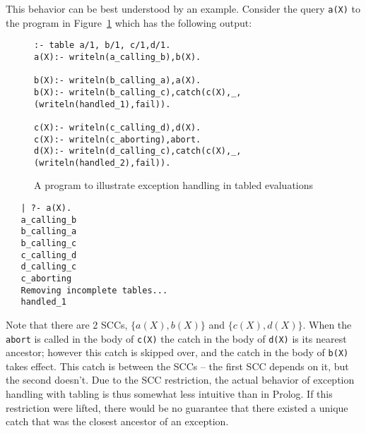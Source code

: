 This behavior can be best understood by an example.  Consider the
query {\tt a(X)} to the program in Figure~\ref{fig:tab_except} which
has the following output:
%
\begin{figure}[bhtp]
\longline
\begin{small}
\begin{verbatim}
:- table a/1, b/1, c/1,d/1.
a(X):- writeln(a_calling_b),b(X).

b(X):- writeln(b_calling_a),a(X).
b(X):- writeln(b_calling_c),catch(c(X),_,(writeln(handled_1),fail)).

c(X):- writeln(c_calling_d),d(X).
c(X):- writeln(c_aborting),abort.
d(X):- writeln(d_calling_c),catch(c(X),_,(writeln(handled_2),fail)).
\end{verbatim}
\end{small}
\caption{A program to illustrate exception handling in tabled evaluations} \label{fig:tab_except}
\longline
\end{figure}

\begin{small}
\begin{verbatim}
   | ?- a(X).
   a_calling_b
   b_calling_a
   b_calling_c
   c_calling_d
   d_calling_c
   c_aborting
   Removing incomplete tables...
   handled_1
\end{verbatim}
\end{small}
%
Note that there are 2 SCCs, $\{a(X),b(X)\}$ and $\{c(X),d(X)\}$.  When
the {\tt abort} is called in the body of {\tt c(X)} the catch in the
body of {\tt d(X)} is its nearest ancestor; however this catch is
skipped over, and the catch in the body of {\tt b(X)} takes effect.
This catch is between the SCCs -- the first SCC depends on it, but the
second doesn't.
%
Due to the SCC restriction, the actual behavior of exception handling
with tabling is thus somewhat less intuitive than in Prolog.  If this
restriction were lifted, there would be no guarantee that there
existed a unique catch that was the closest ancestor of an exception.

